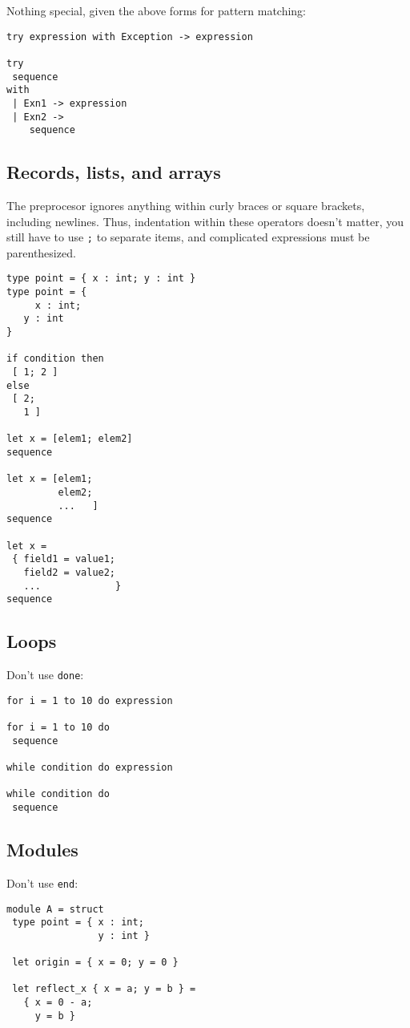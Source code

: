 \documentclass{article}
\begin{document}
Nothing special, given the above forms for pattern matching:

\begin{verbatim}
try expression with Exception -> expression
 
try
 sequence
with
 | Exn1 -> expression
 | Exn2 ->
    sequence

\end{verbatim}

\subsection*{Records, lists, and arrays}

\noindent The preprocesor ignores anything within curly braces or square brackets, including newlines. Thus, indentation within these operators doesn't matter, you still have to use {\tt ;} to separate items, and complicated expressions must be parenthesized.

\begin{verbatim}
type point = { x : int; y : int }
type point = {
     x : int;
   y : int
}

if condition then
 [ 1; 2 ]
else
 [ 2;
   1 ]

let x = [elem1; elem2]
sequence

let x = [elem1;
         elem2;
         ...   ]
sequence

let x =
 { field1 = value1;
   field2 = value2;
   ...             }
sequence
\end{verbatim}

\subsection*{Loops}

Don't use {\tt done}:

\begin{verbatim}
for i = 1 to 10 do expression

for i = 1 to 10 do
 sequence

while condition do expression

while condition do
 sequence
\end{verbatim}

\subsection*{Modules}

Don't use {\tt end}:

\begin{verbatim}
module A = struct
 type point = { x : int;
                y : int }

 let origin = { x = 0; y = 0 }

 let reflect_x { x = a; y = b } =
   { x = 0 - a;
     y = b }
\end{verbatim}
\end{document}
